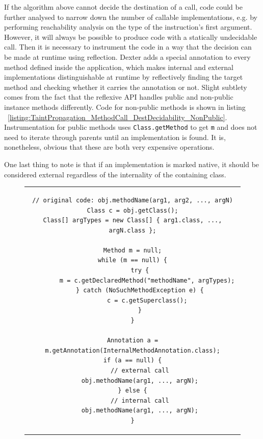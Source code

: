 \documentclass[12pt,twoside,notitlepage]{report}
\begin{document}
If the algorithm above cannot decide the destination of a call, code could be further analysed to narrow down the number of callable implementations, e.g. by performing reachability analysis on the type of the instruction's first argument. However, it will always be possible to produce code with a statically undecidable call. Then it is necessary to instrument the code in a way that the decision can be made at runtime using reflection. Dexter adds a special annotation to every method defined inside the application, which makes internal and external implementations distinguishable at runtime by reflectively finding the target method and checking whether it carries the annotation or not. Slight subtlety comes from the fact that the reflexive API handles public and non-public instance methods differently. Code for non-public methods is shown in listing ~\ref{listing:TaintPropagation_MethodCall_DestDecidability_NonPublic}. Instrumentation for public methods uses \verb$Class.getMethod$ to get \verb$m$ and does not need to iterate through parents until an implementation is found. It is, nonetheless, obvious that these are both very expensive operations. 

One last thing to note is that if an implementation is marked native, it should be considered external regardless of the internality of the containing class. 

\begin{figure}[h]
	\centering
	\begin{tabular}{c}
	\begin{lstlisting}
// original code: obj.methodName(arg1, arg2, ..., argN)
Class c = obj.getClass();
Class[] argTypes = new Class[] { arg1.class, ..., argN.class };

Method m = null;
while (m == null) {
	try {
 		m = c.getDeclaredMethod("methodName", argTypes);
 	} catch (NoSuchMethodException e) {
 		c = c.getSuperclass();
 	}
}

Annotation a = m.getAnnotation(InternalMethodAnnotation.class);
if (a == null) {
	// external call
	obj.methodName(arg1, ..., argN);
} else {
	// internal call
	obj.methodName(arg1, ..., argN);
}
	\end{lstlisting}
	\end{tabular}
	\begin{lstlisting}[caption={Destination-deciding instrumentation for non-public methods},
	                   label={listing:TaintPropagation_MethodCall_DestDecidability_NonPublic}]
	\end{lstlisting}
\end{figure}
\end{document}
